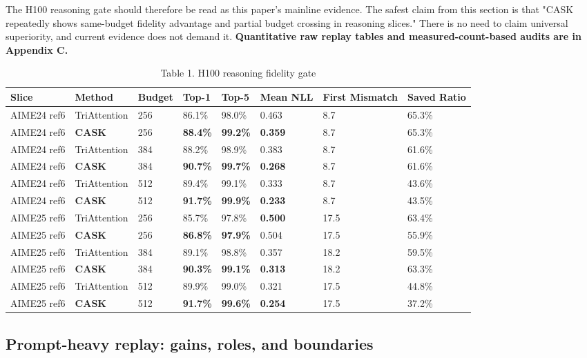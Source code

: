 The H100 reasoning gate should therefore be read as this paper's mainline evidence. The safest claim from this section is that "CASK repeatedly shows same-budget fidelity advantage and partial budget crossing in reasoning slices." There is no need to claim universal superiority, and current evidence does not demand it. \textbf{Quantitative raw replay tables and measured-count-based audits are in Appendix C.}


\begin{table}[H]
\centering
\small
\caption{Table 1. H100 reasoning fidelity gate}
\begin{tabularx}{\textwidth}{YYYYYYYY}
\toprule
Slice & Method & Budget & Top-1 & Top-5 & Mean NLL & First Mismatch & Saved Ratio \\
\midrule
AIME24 ref6 & TriAttention & 256 & 86.1\% & 98.0\% & 0.463 & 8.7 & 65.3\% \\
AIME24 ref6 & \textbf{CASK} & 256 & \textbf{88.4\%} & \textbf{99.2\%} & \textbf{0.359} & 8.7 & 65.3\% \\
AIME24 ref6 & TriAttention & 384 & 88.2\% & 98.9\% & 0.383 & 8.7 & 61.6\% \\
AIME24 ref6 & \textbf{CASK} & 384 & \textbf{90.7\%} & \textbf{99.7\%} & \textbf{0.268} & 8.7 & 61.6\% \\
AIME24 ref6 & TriAttention & 512 & 89.4\% & 99.1\% & 0.333 & 8.7 & 43.6\% \\
AIME24 ref6 & \textbf{CASK} & 512 & \textbf{91.7\%} & \textbf{99.9\%} & \textbf{0.233} & 8.7 & 43.5\% \\
AIME25 ref6 & TriAttention & 256 & 85.7\% & 97.8\% & \textbf{0.500} & 17.5 & 63.4\% \\
AIME25 ref6 & \textbf{CASK} & 256 & \textbf{86.8\%} & \textbf{97.9\%} & 0.504 & 17.5 & 55.9\% \\
AIME25 ref6 & TriAttention & 384 & 89.1\% & 98.8\% & 0.357 & 18.2 & 59.5\% \\
AIME25 ref6 & \textbf{CASK} & 384 & \textbf{90.3\%} & \textbf{99.1\%} & \textbf{0.313} & 18.2 & 63.3\% \\
AIME25 ref6 & TriAttention & 512 & 89.9\% & 99.0\% & 0.321 & 17.5 & 44.8\% \\
AIME25 ref6 & \textbf{CASK} & 512 & \textbf{91.7\%} & \textbf{99.6\%} & \textbf{0.254} & 17.5 & 37.2\% \\
\bottomrule
\end{tabularx}
\end{table}


\subsection{Prompt-heavy replay: gains, roles, and boundaries}


